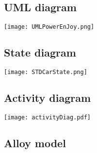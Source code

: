 \documentclass{scrreprt}
\begin{document}
\subsection{UML diagram}
\begin{center}
\texttt{[image: UMLPowerEnJoy.png]}
\end{center}

\subsection{State diagram}
\begin{center}
\texttt{[image: STDCarState.png]}
\end{center}
\begin{comment}
\begin{figure}
\caption{}
\texttt{[image: ]}
\end{figure}
\end{comment}

\subsection{Activity diagram}
\begin{center}
\texttt{[image: activityDiag.pdf]}
\end{center}

\begin{comment}$<$Optionally, include any pertinent analysis models, such as data flow 
diagrams, class diagrams, state-transition diagrams, or entity-relationship 
diagrams.$>$
\end{comment}

\subsection{Alloy model}
\end{document}
